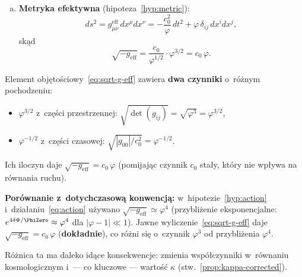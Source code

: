 \begin{hypothesis}
\begin{enumerate}[(a)]
  \item \textbf{Metryka efektywna} (hipoteza~\ref{hyp:metric}):
  \begin{equation}\label{eq:g-eff-unified}
    ds^2 = g_{\mu\nu}^{\mathrm{eff}}\,dx^\mu dx^\nu
    = -\frac{c_0^2}{\varphi}\,dt^2 + \varphi\,\delta_{ij}\,dx^i dx^j,
  \end{equation}
  sk\k{a}d
  \begin{equation}\label{eq:sqrt-g-eff}
    \sqrt{-g_{\mathrm{eff}}}
    = \frac{c_0}{\varphi^{1/2}}\cdot\varphi^{3/2}
    = c_0\,\varphi.
  \end{equation}
\end{enumerate}
\end{hypothesis}

\begin{remark}%
\label{rem:volume-element}
Element obj\k{e}to\'sciowy~\eqref{eq:sqrt-g-eff} zawiera
\textbf{dwa czynniki} o~r\'o\.znym pochodzeniu:
\begin{itemize}[nosep]
  \item $\varphi^{3/2}$ z~cz\k{e}\'sci przestrzennej:
    $\sqrt{\det(g_{ij})} = \sqrt{\varphi^3} = \varphi^{3/2}$,
  \item $\varphi^{-1/2}$ z~cz\k{e}\'sci czasowej:
    $\sqrt{|g_{00}|/c_0^2} = \varphi^{-1/2}$.
\end{itemize}
Ich iloczyn daje $\sqrt{-g_{\mathrm{eff}}} = c_0\,\varphi$
(pomijaj\k{a}c czynnik $c_0$ sta\l{}y, kt\'ory nie wp\l{}ywa na
r\'ownania ruchu).

\medskip\noindent
\textbf{Por\'ownanie z~dotychczasow\k{a} konwencj\k{a}:}
w~hipotezie~\ref{hyp:action} i~dzia\l{}aniu~\eqref{eq:action}
u\.zywano
$\sqrt{-g_{\mathrm{eff}}} \simeq \varphi^4$
(przybli\.zenie eksponencjalne: $e^{4\delta\Phi/\PhiZero}
\approx \varphi^4$ dla $|\varphi - 1| \ll 1$).
Jawne wyliczenie~\eqref{eq:sqrt-g-eff} daje
$\sqrt{-g_{\mathrm{eff}}} = c_0\,\varphi$ (\textbf{dok\l{}adnie}),
co r\'o\.zni si\k{e} o~czynnik $\varphi^3$ od przybli\.zenia $\varphi^4$.

R\'o\.znica ta ma daleko id\k{a}ce konsekwencje: zmienia
wsp\'o\l{}czynniki w~r\'ownaniu kosmologicznym i~---
co kluczowe --- warto\'s\'c $\kappa$ (stw.~\ref{prop:kappa-corrected}).
\end{remark}

